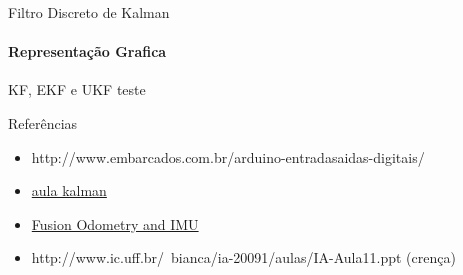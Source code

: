 \documentclass{beamer}
\begin{document}
\begin{frame}{Filtro Discreto de Kalman}
    \framesubtitle{Representação Grafica}

    

\end{frame}




\begin{frame}{KF, EKF e UKF}
  teste
\end{frame}

\begin{frame}[t]{Referências}
    \begin{itemize}
        \item http://www.embarcados.com.br/arduino-entradasaidas-digitais/
        \item \href{https://www.youtube.com/watch?v=DE6Jn2cB4J4&list=PLgnQpQtFTOGQrZ4O5QzbIHgl3b1JHimN_&index=5}{aula kalman} 
        \item \href{https://www.youtube.com/watch?v=QZ5q59H2qaI}{Fusion Odometry and IMU}
        \item http://www.ic.uff.br/~bianca/ia-20091/aulas/IA-Aula11.ppt (crença)
    \end{itemize}
\end{frame}
\end{document}
